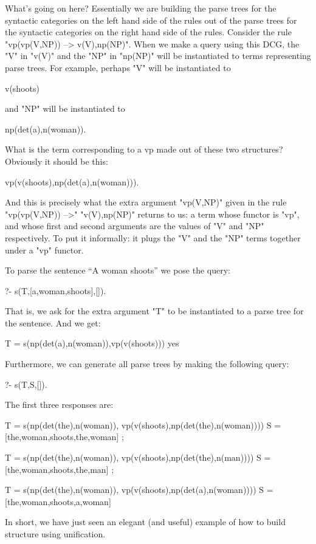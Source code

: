 What's going on here? Essentially we are building the parse trees for
the syntactic categories on the left hand side of the rules out of the
parse trees for the syntactic categories on the right hand side of the
rules. Consider the rule "vp(vp(V,NP)) --> v(V),np(NP)".  When we make
a query using this DCG, the "V" in "v(V)" and the "NP" in "np(NP)"
will be instantiated to terms representing parse trees. For example,
perhaps "V" will be instantiated to
\begin{LPNcodedisplay}
v(shoots)
\end{LPNcodedisplay}
and "NP" will be instantiated to
\begin{LPNcodedisplay}
np(det(a),n(woman)).
\end{LPNcodedisplay}
What is the term corresponding to a vp made out of these
two structures? Obviously it should be this:
\begin{LPNcodedisplay}
vp(v(shoots),np(det(a),n(woman))).
\end{LPNcodedisplay}
And this is precisely what the extra argument "vp(V,NP)" given in the
rule "vp(vp(V,NP)) -->" "v(V),np(NP)" returns to us:  a term
whose functor is "vp", and whose first and second arguments are the
values of "V" and "NP" respectively. To put it informally: it plugs
the "V" and the "NP" terms together under a "vp" functor.

To parse the sentence ``A woman shoots'' we pose the query:
\begin{LPNcodedisplay}
?- s(T,[a,woman,shoots],[]).
\end{LPNcodedisplay}
That is, we ask for the extra argument "T" to be instantiated
to a parse tree for the sentence.  And we get:
\begin{LPNcodedisplay}
T = s(np(det(a),n(woman)),vp(v(shoots)))
yes
\end{LPNcodedisplay}

Furthermore, we can generate all parse trees by making the following
query:
\begin{LPNcodedisplay}
?- s(T,S,[]).
\end{LPNcodedisplay}
The first three responses are:
\begin{LPNcodedisplay}
T = s(np(det(the),n(woman)),
      vp(v(shoots),np(det(the),n(woman))))
S = [the,woman,shoots,the,woman] ;

T = s(np(det(the),n(woman)),
      vp(v(shoots),np(det(the),n(man))))
S = [the,woman,shoots,the,man] ;

T = s(np(det(the),n(woman)),
      vp(v(shoots),np(det(a),n(woman))))
S = [the,woman,shoots,a,woman]
\end{LPNcodedisplay}
In short, we have just seen an elegant (and useful) example of how to
build structure using unification.

